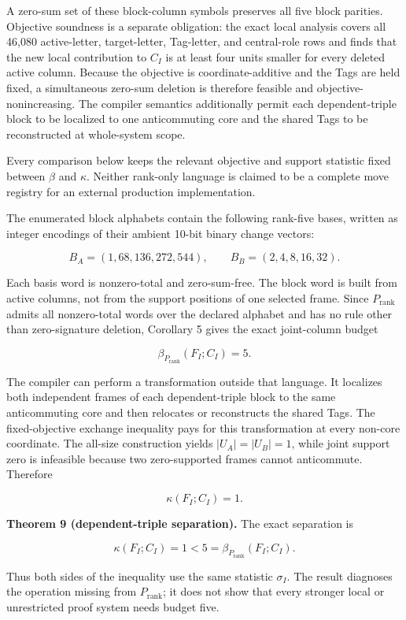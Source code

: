 \documentclass[11pt]{article}
\begin{document}
A zero-sum set of these block-column symbols preserves all five block parities. Objective soundness is a separate obligation: the exact local analysis covers all 46,080 active-letter, target-letter, Tag-letter, and central-role rows and finds that the new local contribution to \(C_I\) is at least four units smaller for every deleted active column. Because the objective is coordinate-additive and the Tags are held fixed, a simultaneous zero-sum deletion is therefore feasible and objective-nonincreasing. The compiler semantics additionally permit each dependent-triple block to be localized to one anticommuting core and the shared Tags to be reconstructed at whole-system scope.

Every comparison below keeps the relevant objective and support statistic fixed between \(\beta\) and \(\kappa\). Neither rank-only language is claimed to be a complete move registry for an external production implementation.

The enumerated block alphabets contain the following rank-five bases, written as integer encodings of their ambient 10-bit binary change vectors:

\[
B_A=(1,68,136,272,544),
\qquad
B_B=(2,4,8,16,32).
\]

Each basis word is nonzero-total and zero-sum-free. The block word is built from active columns, not from the support positions of one selected frame. Since \(P_{\mathrm{rank}}\) admits all nonzero-total words over the declared alphabet and has no rule other than zero-signature deletion, Corollary 5 gives the exact joint-column budget

\[
\beta_{P_{\mathrm{rank}}}(F_I;C_I)=5.
\]

The compiler can perform a transformation outside that language. It localizes both independent frames of each dependent-triple block to the same anticommuting core and then relocates or reconstructs the shared Tags. The fixed-objective exchange inequality pays for this transformation at every non-core coordinate. The all-size construction yields \(|U_A|=|U_B|=1\), while joint support zero is infeasible because two zero-supported frames cannot anticommute. Therefore

\[
\kappa(F_I;C_I)=1.
\]

\textbf{Theorem 9 (dependent-triple separation).} The exact separation is

\[
\kappa(F_I;C_I)=1
<5
=\beta_{P_{\mathrm{rank}}}(F_I;C_I).
\]

Thus both sides of the inequality use the same statistic \(\sigma_I\). The result diagnoses the operation missing from \(P_{\mathrm{rank}}\); it does not show that every stronger local or unrestricted proof system needs budget five.
\end{document}
